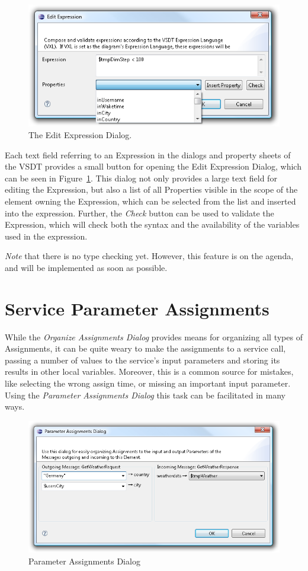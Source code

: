 \begin{figure}[ht]
	\centering
	\includegraphics[width=.5\textwidth]{figures/features/editExp.png}
	\caption{The Edit Expression Dialog.}
	\label{fig:editExp}
\end{figure}

Each text field referring to an Expression in the dialogs and property sheets of
the VSDT provides a small button for opening the Edit Expression Dialog, which
can be seen in Figure~\ref{fig:editExp}.  This dialog not only provides a large
text field for editing the Expression, but also a list of all Properties visible
in the scope of the element owning the Expression, which can be selected from the
list and inserted into the expression.  Further, the \emph{Check} button can be
used to validate the Expression, which will check both the syntax and the
availability of the variables used in the expression.

\emph{Note} that there is no type checking yet.  However, this feature is on the
agenda, and will be implemented as soon as possible.



\section{Service Parameter Assignments}

While the \emph{Organize Assignments Dialog} provides means for organizing all
types of Assignments, it can be quite weary to make the assignments to a service
call, passing a number of values to the service's input parameters and storing
its results in other local variables.  Moreover, this is a common source for
mistakes, like selecting the wrong assign time, or missing an important input
parameter.  Using the \emph{Parameter Assignments Dialog} this task can be
facilitated in many ways.

\begin{figure}[ht]
	\centering
	\includegraphics[width=.6\textwidth]{figures/features/paramAssign.png}
	\caption{Parameter Assignments Dialog}
	\label{fig:paramAssign}
\end{figure}

